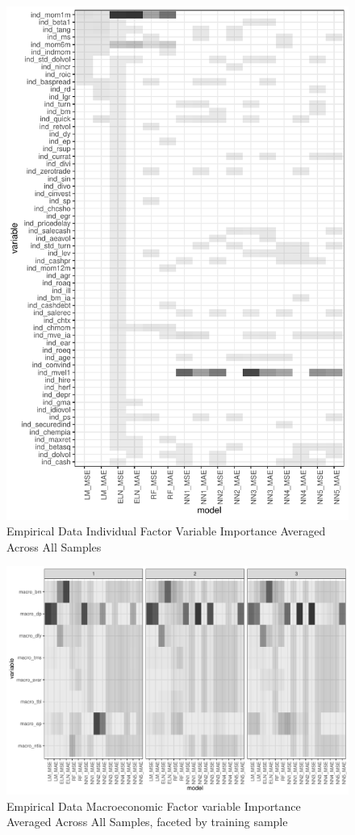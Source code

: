 \documentclass[a4paper, table]{article}
\begin{document}
\begin{figure}
	\includegraphics{empirical_sample_all_vi_ind.pdf}
	\caption{Empirical Data Individual Factor Variable Importance Averaged Across All Samples}
\end{figure}

\begin{landscape}
\begin{figure}
	\includegraphics{empirical_sample_all_vi_macro_facet.pdf}
	\caption{Empirical Data Macroeconomic Factor variable Importance Averaged Across All Samples, faceted by training sample}
	\label{empirical_macro_facet}
\end{figure}
\end{landscape}
\end{document}
